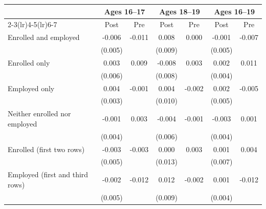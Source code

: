 \begin{tabular}{lcccccc}
\toprule
 & \multicolumn{2}{c}{Ages 16--17} & \multicolumn{2}{c}{Ages 18--19} & \multicolumn{2}{c}{Ages 16--19} \\
\cmidrule(lr){2-3}\cmidrule(lr){4-5}\cmidrule(lr){6-7}
 & Post & Pre & Post & Pre & Post & Pre \\
\midrule
Enrolled and employed & -0.006 & -0.011 & 0.008 & 0.000 & -0.001 & -0.007 \\
 & (0.005) &  & (0.009) &  & (0.005) &  \\
Enrolled only & 0.003 & 0.009 & -0.008 & 0.003 & 0.002 & 0.011 \\
 & (0.006) &  & (0.008) &  & (0.004) &  \\
Employed only & 0.004 & -0.001 & 0.004 & -0.002 & 0.002 & -0.005 \\
 & (0.003) &  & (0.010) &  & (0.005) &  \\
Neither enrolled nor employed & -0.001 & 0.003 & -0.004 & -0.001 & -0.003 & 0.001 \\
 & (0.004) &  & (0.006) &  & (0.004) &  \\
Enrolled (first two rows) & -0.003 & -0.003 & 0.000 & 0.003 & 0.001 & 0.004 \\
 & (0.005) &  & (0.013) &  & (0.007) &  \\
Employed (first and third rows) & -0.002 & -0.012 & 0.012 & -0.002 & 0.001 & -0.012 \\
 & (0.005) &  & (0.009) &  & (0.004) &  \\
\bottomrule
\end{tabular}
